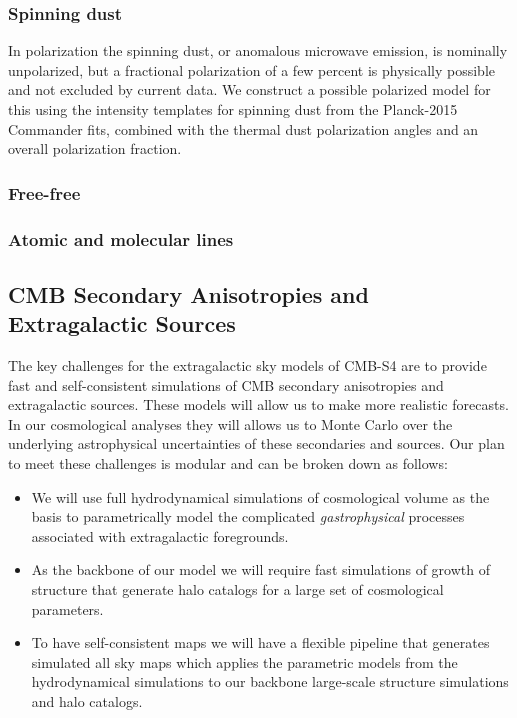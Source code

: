 \subsubsection{Spinning dust}
In polarization the spinning dust, or anomalous microwave emission, is nominally unpolarized, but a fractional polarization of a few percent is physically possible and not excluded by current data. We construct a possible polarized model for this using the intensity templates for spinning dust from the Planck-2015 Commander fits, combined with the thermal dust polarization angles and an overall polarization fraction.

\subsubsection{Free-free}

\subsubsection{Atomic and molecular lines}

\subsection{CMB Secondary Anisotropies and Extragalactic Sources}

The key challenges for the extragalactic sky models of CMB-S4 are to provide fast and self-consistent simulations of CMB secondary anisotropies and extragalactic sources. These models will allow us to make more realistic forecasts. In our cosmological analyses they will allows us to Monte Carlo over the underlying astrophysical uncertainties of these secondaries and sources. Our plan to meet these challenges is modular and can be broken down as follows: 

\begin{itemize}
\item We will use full hydrodynamical simulations of cosmological volume as the basis to parametrically model the complicated {\it gastrophysical} processes associated with extragalactic foregrounds.
\item As the backbone of our model we will require fast simulations of growth of structure that generate halo catalogs for a large set of cosmological parameters.
\item To have self-consistent maps we will have a flexible pipeline that generates simulated all sky maps which applies the parametric models from the hydrodynamical simulations to our backbone large-scale structure simulations and halo catalogs.
\end{itemize}

